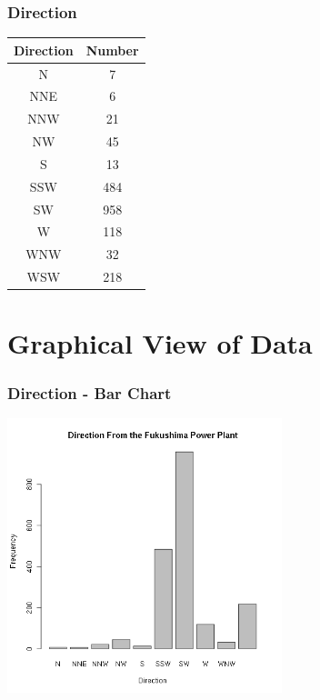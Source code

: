 \begin{frame}
  \frametitle{Direction}

  \begin{tabular}{c|c}
    Direction & Number \\ \hline
    N  & 7 \\
    NNE & 6 \\
    NNW & 21 \\
    NW   & 45 \\
    S  & 13 \\
    SSW  & 484 \\
    SW   & 958 \\
    W & 118 \\
    WNW & 32 \\
    WSW & 218
  \end{tabular}

\end{frame}

\section{Graphical View of Data}

\begin{frame}
  \frametitle{Direction - Bar Chart}

  \begin{center}
    \includegraphics[width=8cm]{img/fukushimaDirectionBarPlot}
  \end{center}

\end{frame}

